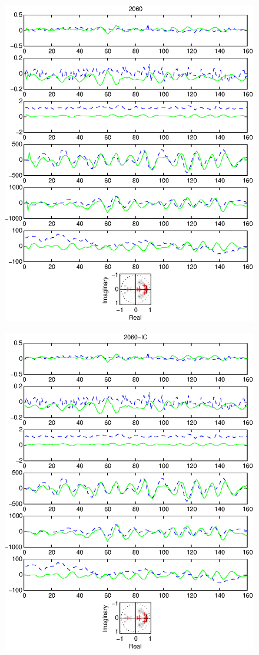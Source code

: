 \documentclass{article}
\begin{document}
\begin{figure}[htb!]\centering
\includegraphics{2060.eps}
\end{figure}\clearpage
\begin{figure}[htb!]\centering
\includegraphics{2060_ic.eps}
\end{figure}\clearpage
\end{document}
